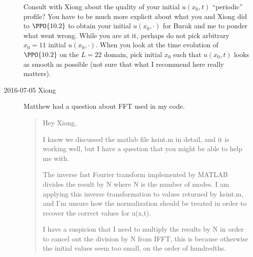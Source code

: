 \begin{description}
{Consult with Xiong about the quality of your initial $u(x_0,t)$
``periodic'' profile? You have to be much more explicit about what you and
Xiong did to $\PPO{10.2}$ to obtain your initial $u(x_0,\cdot)$ for Burak
and me to ponder what went wrong. While you are at it, perhaps do not
pick arbitrary $x_0=11$ initial $u(x_0,\cdot)$. When you look at the time
evolution of $\PPO{10.2}$ on the $L=22$ domain, pick initial $x_0$ such
that $u(x_0,t)$ looks as smooth as possible (not sure that what I
recommend here really matters).
    }



\item[2016-07-05 Xiong]
Matthew had a question about FFT used in my code.
\begin{quotation}
  Hey Xiong,

  I know we discussed the matlab file ksint.m in detail, and it is working well, but I have a question that you might be able to help me with.

  The inverse fast Fourier transform implemented by MATLAB divides the result by N where N is the number of modes. I am applying this inverse transformation to values returned by ksint.m, and I'm unsure how the normalization should be treated in order to recover the correct values for u(x,t).

  I have a suspicion that I need to multiply the results by N in order to cancel out the division by N from IFFT, this is because otherwise the initial values seem too small, on the order of hundredths.


\end{quotation}
\end{description}
